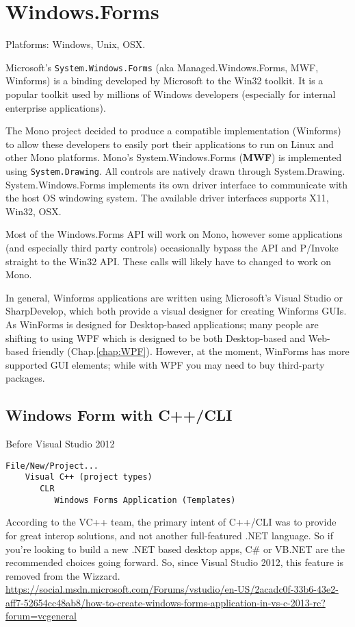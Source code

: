 \chapter{Windows.Forms}
\label{chap:Windows.Forms}

Platforms: Windows, Unix, OSX.

Microsoft's \verb!System.Windows.Forms! (aka Managed.Windows.Forms, MWF,
Winforms) is a binding developed by Microsoft to the Win32 toolkit. It is 
 a popular toolkit used by millions of Windows developers (especially for
internal enterprise applications).

The Mono project decided to produce a compatible implementation (Winforms) to
allow these developers to easily port their applications to run on Linux and other Mono platforms.   
Mono's System.Windows.Forms ({\bf MWF}) is implemented using
\verb!System.Drawing!.
All controls are natively drawn through System.Drawing.
System.Windows.Forms implements its own driver interface to communicate with the
host OS windowing system. The available driver interfaces supports X11, Win32,
OSX.

Most of the Windows.Forms API will work on Mono, however some applications (and
especially third party controls) occasionally bypass the API and P/Invoke
straight to the Win32 API. These calls will likely have to changed to work on
Mono.  

In general, Winforms applications are written using Microsoft's Visual Studio or
SharpDevelop, which both provide a visual designer for creating Winforms GUIs.
As WinForms is designed for Desktop-based applications; many people are shifting
to using WPF which is designed to be both Desktop-based and Web-based friendly
(Chap.\ref{chap:WPF}). However, at the moment, WinForms has more supported GUI
elements; while with WPF you may need to buy third-party packages.

\section{Windows Form with C++/CLI}

Before Visual Studio 2012
\begin{verbatim}
File/New/Project...
    Visual C++ (project types)
       CLR
          Windows Forms Application (Templates)
\end{verbatim}

According to the VC++ team, the primary intent of C++/CLI was to provide for
great interop solutions, and not another full-featured .NET language. So if
you're looking to build a new .NET based desktop apps, C\# or VB.NET are the
recommended choices going forward.  So, since Visual Studio 2012, this feature
is removed from the Wizzard.
\url{https://social.msdn.microsoft.com/Forums/vstudio/en-US/2acadc0f-33b6-43e2-aff7-52654cc48ab8/how-to-create-windows-forms-application-in-vs-c-2013-rc?forum=vcgeneral}

